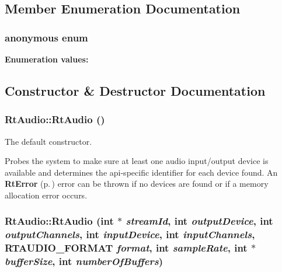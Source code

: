 \subsection{Member Enumeration Documentation}
\subsubsection{\setlength{\rightskip}{0pt plus 5cm}anonymous enum}\label{classRtAudio_s3}


\begin{Desc}
\item[{\bf Enumeration values:}]\par
\begin{description}
\item[
{\em MAX\_\-SAMPLE\_\-RATES}\label{classRtAudio_s3s2}
]\end{description}
\end{Desc}



\subsection{Constructor \& Destructor Documentation}
\subsubsection{\setlength{\rightskip}{0pt plus 5cm}Rt\-Audio::Rt\-Audio ()}\label{classRtAudio_a0}


The default constructor.

Probes the system to make sure at least one audio input/output device is available and determines the api-specific identifier for each device found. An {\bf Rt\-Error} {\rm (p.\,\pageref{classRtError})} error can be thrown if no devices are found or if a memory allocation error occurs. 
\subsubsection{\setlength{\rightskip}{0pt plus 5cm}Rt\-Audio::Rt\-Audio (int $\ast$ {\em stream\-Id}, int {\em output\-Device}, int {\em output\-Channels}, int {\em input\-Device}, int {\em input\-Channels}, {\bf RTAUDIO\_\-FORMAT} {\em format}, int {\em sample\-Rate}, int $\ast$ {\em buffer\-Size}, int {\em number\-Of\-Buffers})}\label{classRtAudio_a1}


